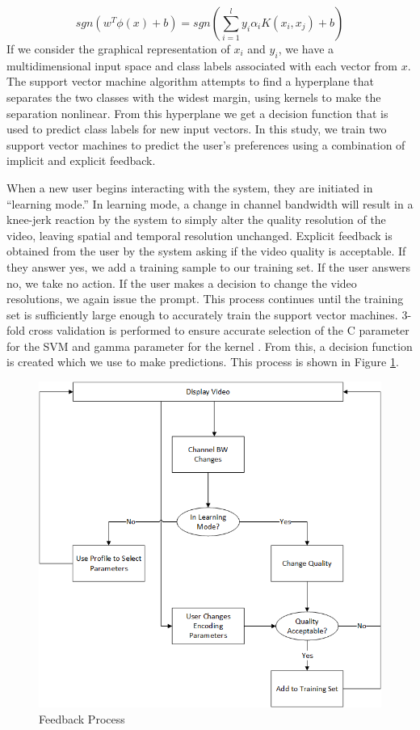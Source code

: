 \documentclass[a4paper,12pt]{article}
\begin{document}
\begin{equation}
\label{equ:DecisionFunction}
sgn(w^T\phi (x) + b) = sgn(\sum_{i=1}^{l} y_i\alpha_i K(x_i, x_j) +b)
\end{equation}
If we consider the graphical representation of $x_i$ and $y_i$, we have a multidimensional input space and class labels associated with each vector from $x$. The support vector machine algorithm attempts to find a hyperplane that separates the two classes with the widest margin, using kernels to make the separation nonlinear. From this hyperplane we get a decision function that is used to predict class labels for new input vectors. In this study, we train two support vector machines to predict the user’s preferences using a combination of implicit and explicit feedback. 

When a new user begins interacting with the system, they are initiated in ``learning mode.'' In learning mode, a change in channel bandwidth will result in a knee-jerk reaction by the system to simply alter the quality resolution of the video, leaving spatial and temporal resolution unchanged. Explicit feedback is obtained from the user by the system asking if the video quality is acceptable. If they answer yes, we add a training sample to our training set. If the user answers no, we take no action. If the user makes a decision to change the video resolutions, we again issue the prompt. This process continues until the training set is sufficiently large enough to accurately train the support vector machines. 3-fold cross validation is performed to ensure accurate selection of the C parameter for the SVM and gamma parameter for the kernel \cite{LibSVM}. From this, a decision function is created which we use to make predictions. This process is shown in Figure \ref{fig:Feedback}.
\begin{figure}[h]
\centering
\includegraphics[width=0.5\linewidth]{BandwidthChangeDecisionTree.png}
\caption{Feedback Process}
\label{fig:Feedback}
\end{figure}
\end{document}
